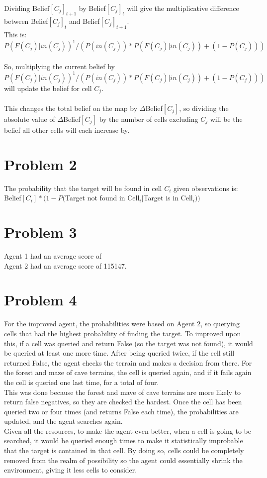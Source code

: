 \documentclass[12pt]{report}
\begin{document}
\\
Dividing Belief$[C_{j}]_{t+1}$ by Belief$[C_{j}]_{t}$ will give the multiplicative difference between Belief$[C_{j}]_{t}$ and Belief$[C_{j}]_{t+1}$.\\
This is: $P(F(C_{j})|in(C_{j}))^{1}/(P(in(C_{j}))*P(F(C_{j})|in(C_{j}))+(1-P(C_{j})))$\\
\\
So, multiplying the current belief by $P(F(C_{j})|in(C_{j}))^{1}/(P(in(C_{j}))*P(F(C_{j})|in(C_{j}))+(1-P(C_{j})))$ will update the belief for cell $C_{j}$.\\
\\
This changes the total belief on the map by $\Delta$Belief$[C_{j}]$, so dividing the absolute value of $\Delta$Belief$[C_{j}]$ by the number of cells excluding $C_{j}$ will be the belief all other cells will each increase by.

\section{Problem 2}
The probability that the target will be found in cell $C_{i}$ given observations is:\\
Belief$[C_{i}]*(1-P($Target not found in Cell$_{i}|$Target is in Cell$_{i}))$

\section{Problem 3}
Agent 1 had an average score of \\
Agent 2 had an average score of 115147.

\section{Problem 4}
For the improved agent, the probabilities were based on Agent 2, so querying cells that had the highest probability of finding the target. To improved upon this, if a cell was queried and return False (so the target was not found), it would be queried at least one more time. After being queried twice, if the cell still returned False, the agent checks the terrain and makes a decision from there. For the forest and maze of cave terrains, the cell is queried again, and if it fails again the cell is queried one last time, for a total of four. \\
This was done because the forest and mave of cave terrains are more likely to return false negatives, so they are checked the hardest. Once the cell has been queried two or four times (and returns False each time), the probabilities are updated, and the agent searches again. \\
Given all the resources, to make the agent even better, when a cell is going to be searched, it would be queried enough times to make it statistically improbable that the target is contained in that cell. By doing so, cells could be completely removed from the realm of possibility so the agent could essentially shrink the environment, giving it less cells to consider.
\end{document}
